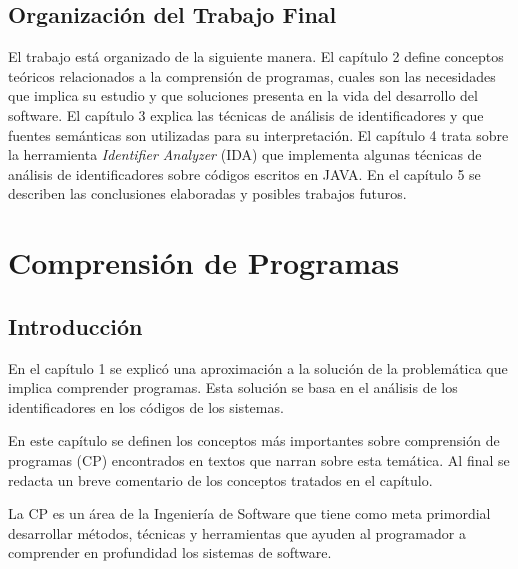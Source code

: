 \documentclass[a4paper,12pt]{report}
\begin{document}
\section{Organización del Trabajo Final}

El trabajo está organizado de la siguiente manera. El capítulo 2 define conceptos teóricos relacionados a la comprensión de programas, cuales son las necesidades que implica su estudio y que soluciones presenta en la vida del desarrollo del software. El capítulo 3 explica las técnicas de análisis de identificadores y que fuentes semánticas son utilizadas para su interpretación. El capítulo 4 trata sobre la herramienta \textit{Identifier Analyzer} (IDA) que implementa algunas técnicas de análisis de identificadores sobre códigos escritos en JAVA.
En el capítulo 5 se describen las conclusiones elaboradas y posibles trabajos futuros.



\chapter{Comprensión de Programas}
\section{Introducción}

En el capítulo 1 se explicó una aproximación a la solución de la problemática que implica comprender programas. Esta solución se basa en el análisis de los identificadores en los códigos de los sistemas.

En este capítulo se definen los conceptos más importantes sobre comprensión de programas (CP) encontrados en textos que narran sobre esta temática. Al final se redacta un breve comentario de los conceptos tratados en el capítulo.

La CP es un área de la Ingeniería de Software que tiene como meta primordial desarrollar métodos, técnicas y herramientas que ayuden al programador a comprender en profundidad los sistemas de software. 
\end{document}
